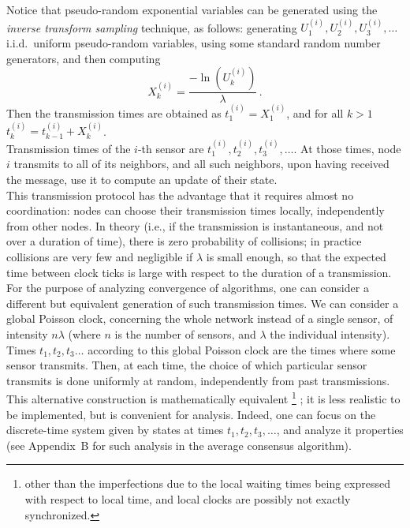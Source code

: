 \documentclass[oneside]{article}
\begin{document}
Notice that pseudo-random exponential variables can be generated using the \emph{inverse transform sampling} technique, as follows: generating $U_1^{(i)}, U_2^{(i)},U_3^{(i)}, \dots$ i.i.d.~uniform pseudo-random variables, using some standard random number generators, and then computing
\[ X_k^{(i)} = \frac{-\ln(U_k^{(i)})}{\lambda} \,.\]
Then the transmission times are obtained as $t_1^{(i)} = X_1^{(i)}$, and for all $k >1$  $t_k^{(i)} = t_{k-1}^{(i)} +X_k^{(i)}$.\\


Transmission times of the $i$-th sensor are $t_1^{(i)}, t_2^{(i)}, t_3^{(i)}, \dots$.
At those times, node $i$ transmits to all of its neighbors, and all such neighbors, upon having received the message, use it to compute an update of their state. \\

This transmission protocol has the advantage that it requires almost no coordination: nodes can choose their transmission times locally, independently from other nodes. In theory (i.e., if the transmission is instantaneous, and not over a duration of time), there is zero probability of collisions; in practice collisions are very few and negligible if $\lambda$ is small enough, so that the expected time between clock ticks is large with respect to the duration of a transmission.\\

For the purpose of analyzing convergence of algorithms, one can consider a different but equivalent generation of such transmission times. We can consider a global Poisson clock, concerning the whole network instead of a single sensor, of intensity $n \lambda$ (where $n$ is the number of sensors, and $\lambda$ the individual intensity). Times $t_1, t_2, t_3 \dots$ according to this global Poisson clock are the times where some sensor transmits. Then, at each time, the choice of which particular sensor transmits is done uniformly at random, independently from past transmissions. This alternative construction is mathematically equivalent%
\footnote{other than the imperfections due to the local waiting times being expressed with respect to local time, and local clocks are possibly not exactly synchronized.}%
; it  is less realistic to be implemented, but is convenient for analysis. Indeed, one can focus on the discrete-time system given by states at times $t_1, t_2, t_3, \dots$, and analyze it properties (see Appendix~B for such analysis in the average consensus algorithm).\\
\end{document}
